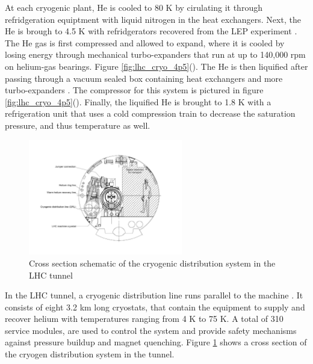 \par At each cryogenic plant, He is cooled to 80 K by cirulating it
through refridgeration equiptment with liquid nitrogen in the heat
exchangers\cite{LHC:LHC_lhc_cryogen_cernWebsite}.  Next, the He is
brough to 4.5 K with refridgerators recovered from the LEP experiment
\cite{LHC:LHC_cool_challenge}.  The He gas is first compressed and allowed
to expand, where it is cooled by losing energy through mechanical
turbo-expanders that run at up to 140,000 rpm on helium-gas
bearings.  Figure
\ref{fig:lhc_cryo_4p5}().  The He
is then liquified after passing through a vacuum sealed box containing
heat exchangers and more turbo-expanders
\cite{LHC:LHC_cryogenicHe_system_Lebrun}. The compressor for this
system is pictured in figure
\ref{fig:lhc_cryo_4p5}().  Finally,
the liquified He is brought to 1.8 K with a refrigeration unit that
uses a cold compression train to decrease the saturation pressure, and
thus temperature as well. 

\begin{figure}[h]
   \centering
  \includegraphics[width=0.6\textwidth]{Figures/LHC_Diagrams/LHC_CryogenInTunnel.pdf}
  \caption{Cross section schematic of the cryogenic distribution
    system in the LHC tunnel} \label{fig:lhc_cryogen_tunnel_xs}
\end{figure}

\par In the LHC tunnel, a cryogenic distribution line runs parallel to
the machine \cite{LHC:LHC_cool_challenge}.  It consists of eight 3.2
km long cryostats, that contain the equipment to supply and recover
helium with temperatures ranging from 4 K to 75 K.  A total of 310
service modules, are used to control the system and provide safety
mechanisms against pressure buildup and magnet quenching.  Figure
\ref{fig:lhc_cryogen_tunnel_xs} shows a cross section of the cryogen
distribution system in the tunnel. 

